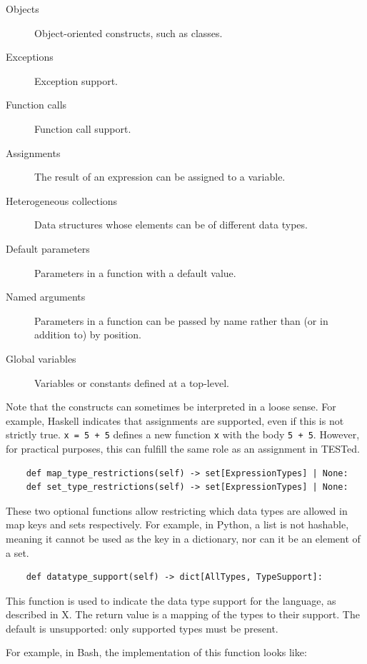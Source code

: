 \documentclass[../main]{subfiles}
\begin{document}
\begin{description}
    \item[Objects] Object-oriented constructs, such as classes.
    \item[Exceptions] Exception support.
    \item[Function calls] Function call support.
    \item[Assignments] The result of an expression can be assigned to a variable.
    \item[Heterogeneous collections] Data structures whose elements can be of different data types.
    \item[Default parameters] Parameters in a function with a default value.
    \item[Named arguments] Parameters in a function can be passed by name rather than (or in addition to) by position.
    \item[Global variables] Variables or constants defined at a top-level.
\end{description}

Note that the constructs can sometimes be interpreted in a loose sense.
For example, Haskell indicates that assignments are supported, even if this is not strictly true.
\texttt{x = 5 + 5} defines a new function \texttt{x} with the body \texttt{5 + 5}.
However, for practical purposes, this can fulfill the same role as an assignment in TESTed.

\begin{verbatim}
    def map_type_restrictions(self) -> set[ExpressionTypes] | None:
    def set_type_restrictions(self) -> set[ExpressionTypes] | None:
\end{verbatim}

These two optional functions allow restricting which data types are allowed in map keys and sets respectively.
For example, in Python, a list is not hashable, meaning it cannot be used as the key in a dictionary, nor can it be an element of a set.

\begin{verbatim}
    def datatype_support(self) -> dict[AllTypes, TypeSupport]:
\end{verbatim}

This function is used to indicate the data type support for the language, as described in X.
The return value is a mapping of the types to their support.
The default is unsupported: only supported types must be present.

For example, in Bash, the implementation of this function looks like:
\end{document}

